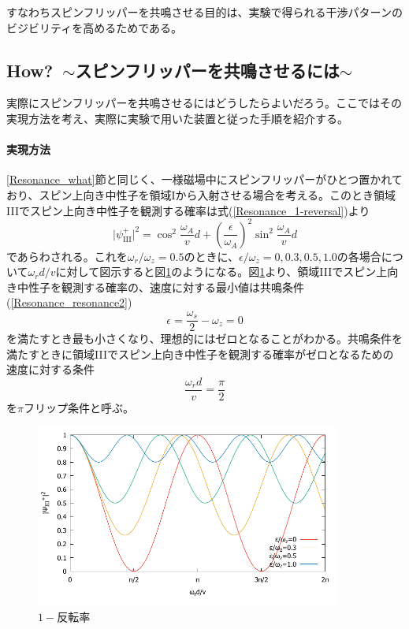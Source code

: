 すなわちスピンフリッパーを共鳴させる目的は、実験で得られる干渉パターンのビジビリティを高めるためである。
\renewcommand{\arraystretch}{1}

\clearpage
\subsection{How?\ $\sim$スピンフリッパーを共鳴させるには$\sim$}
実際にスピンフリッパーを共鳴させるにはどうしたらよいだろう。ここではその実現方法を考え、実際に実験で用いた装置と従った手順を紹介する。

\paragraph{実現方法}
\ref{Resonance_what}節と同じく、一様磁場中にスピンフリッパーがひとつ置かれており、スピン上向き中性子を領域Iから入射させる場合を考える。このとき領域IIIでスピン上向き中性子を観測する確率は式(\ref{Resonance_1-reversal})より
\begin{equation}
\bigl|\psi_\mathrm{III}^+\bigr|^2 =\cos^2 \frac{\omega_A}{v}d+\left(\frac{\epsilon}{\omega_A}\right)^2\sin^2\frac{\omega_A}{v}d
\end{equation}
であらわされる。これを$\omega_r/\omega_z=0.5$のときに、$\epsilon/\omega_z=0,0.3,0.5,1.0$の各場合について$\omega_r d/v$に対して図示すると図\ref{Resonance_fig_1-reversal}のようになる。図\ref{Resonance_fig_1-reversal}より、領域IIIでスピン上向き中性子を観測する確率の、速度に対する最小値は共鳴条件(\ref{Resonance_resonance2})
\[
\epsilon=\frac{\omega_s}{2}-\omega_z=0
\]
を満たすとき最も小さくなり、理想的にはゼロとなることがわかる。共鳴条件を満たすときに領域IIIでスピン上向き中性子を観測する確率がゼロとなるための速度に対する条件
\begin{equation}
\frac{\omega_rd}{v}=\frac{\pi}{2}
\end{equation}
を$\pi$フリップ条件と呼ぶ。
\begin{figure}[h]
\begin{center}
\includegraphics[width=10cm]{resonance/whatwhyhow/resonance_1-reversal.pdf}
\caption{$1-反転率$}
\label{Resonance_fig_1-reversal}
\end{center}
\end{figure}

